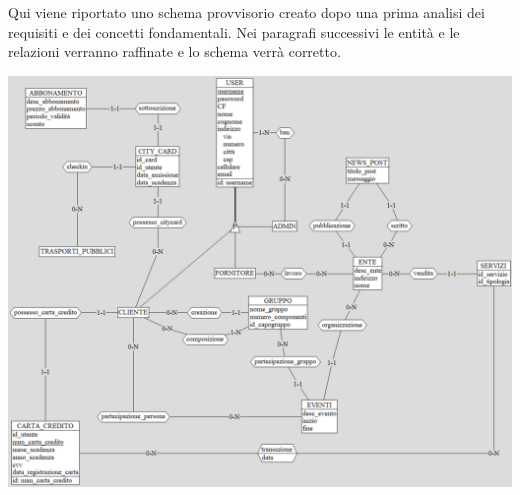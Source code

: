 Qui viene riportato uno schema provvisorio creato dopo una prima analisi dei requisiti e dei concetti fondamentali. Nei paragrafi successivi le entità e le relazioni verranno raffinate e lo schema verrà corretto.

\includegraphics[width=0.95\columnwidth]{images/Schema_Iniziale.png}